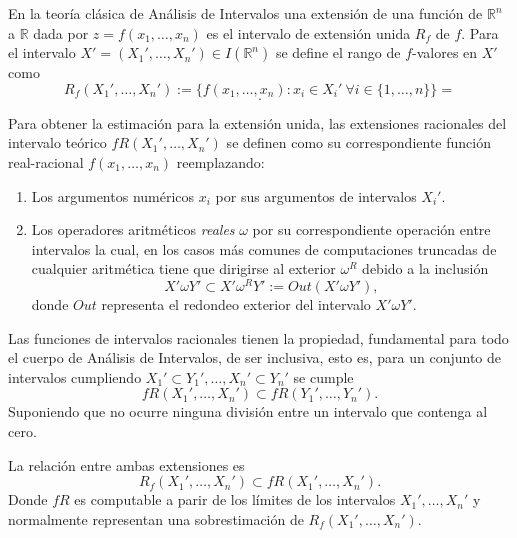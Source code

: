 En la teoría clásica de Análisis de Intervalos una extensión de una función de $\mathbb{R}^n$ a $\mathbb{R}$ dada por $z = f(x_1, \dotso, x_n)$ es el intervalo de extensión unida $R_f$ de $f$. Para el intervalo $X' = (X_1',\dotso, X_n') \in I(\mathbb{R}^n)$ se define el rango de $f$-valores en $X'$ como
\begin{equation}
R_f(X_1',\dotso, X_n') := \{ f(x_1, \dotso, x_n) : x_i \in X_i' \ \forall i \in \{1, \dotso, n \} \} =
\nonumber
\end{equation}
\begin{equation}
[\min \{ f(x_1, \dotso, x_n) : x_i \in X_i' \ \forall i \in \{1, \dotso, n \} \}, \max \{ f(x_1, \dotso, x_n) : x_i \in X_i' \ \forall i \in \{1, \dotso, n \} \}].
\nonumber
\end{equation}

Para obtener la estimación para la extensión unida, las extensiones racionales del intervalo teórico $fR(X_1', \dotso, X_n')$ se definen como su correspondiente función real-racional $f(x_1, \dotso, x_n)$ reemplazando:
\begin{enumerate}
\item Los argumentos numéricos $x_i$ por sus argumentos de intervalos $X_i'$.
\item Los operadores aritméticos{ \em reales} $\omega$ por su correspondiente operación entre intervalos la cual, en los casos más comunes de computaciones truncadas de cualquier aritmética tiene que dirigirse al exterior $\omega^R$ debido a la inclusión
$$X' \omega Y' \subset X' \omega^R Y' := Out(X' \omega Y'),$$
donde $Out$ representa el redondeo exterior del intervalo $X' \omega Y'$.
\end{enumerate}

Las funciones de intervalos racionales tienen la propiedad, fundamental para todo el cuerpo de Análisis de Intervalos, de ser inclusiva, esto es, para un conjunto de intervalos cumpliendo $X_1' \subset Y_1', \dotso, X_n' \subset Y_n'$ se cumple
\begin{equation}
f R(X_1', \dotso, X_n') \subset f R(Y_1', \dotso, Y_n').
\nonumber
\end{equation}
Suponiendo que no ocurre  ninguna división entre un intervalo que contenga al cero.

La relación entre ambas extensiones es
\begin{equation}
R_f(X_1', \dotso, X_n') \subset f R(X_1', \dotso, X_n').
\nonumber
\end{equation}
Donde $f R$ es computable a parir de los límites de los intervalos $X_1', \dotso, X_n'$ y normalmente representan una sobrestimación de $R_f(X_1', \dotso, X_n')$.

